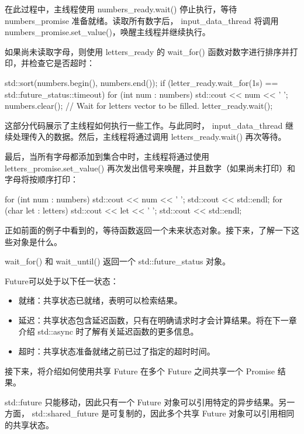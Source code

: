 在此过程中，主线程使用 numbers\_ready.wait() 停止执行，等待 numbers\_promise 准备就绪。读取所有数字后， input\_data\_thread 将调用 numbers\_promise.set\_value()，唤醒主线程并继续执行。

如果尚未读取字母，则使用 letters\_ready 的 wait\_for() 函数对数字进行排序并打印，并检查它是否超时：

\begin{cpp}
std::sort(numbers.begin(), numbers.end());
if (letter_ready.wait_for(1s) == std::future_status::timeout) {
    for (int num : numbers) std::cout << num << ' ';
    numbers.clear();
}
// Wait for letters vector to be filled.
letter_ready.wait();
\end{cpp}

这部分代码展示了主线程如何执行一些工作。与此同时， input\_data\_thread 继续处理传入的数据。然后，主线程将通过调用 letters\_ready.wait() 再次等待。

最后，当所有字母都添加到集合中时，主线程将通过使用 letters\_promise.set\_value() 再次发出信号来唤醒，并且数字（如果尚未打印）和字母将按顺序打印：

\begin{cpp}
for (int num : numbers) std::cout << num << ' ';
std::cout << std::endl;
for (char let : letters) std::cout << let << ' ';
std::cout << std::endl;
\end{cpp}

正如前面的例子中看到的，等待函数返回一个未来状态对象。接下来，了解一下这些对象是什么。


wait\_for() 和 wait\_until() 返回一个 std::future\_status 对象。

Future可以处于以下任一状态：

\begin{itemize}
\item
就绪：共享状态已就绪，表明可以检索结果。

\item
延迟：共享状态包含延迟函数，只有在明确请求时才会计算结果。将在下一章介绍 std::async 时了解有关延迟函数的更多信息。

\item
超时：共享状态准备就绪之前已过了指定的超时时间。
\end{itemize}

接下来，将介绍如何使用共享 Future 在多个 Future 之间共享一个 Promise 结果。


std::future 只能移动，因此只有一个 Future 对象可以引用特定的异步结果。另一方面， std::shared\_future 是可复制的，因此多个共享 Future 对象可以引用相同的共享状态。

